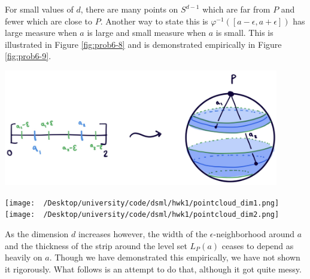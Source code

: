 \begin{homework}[e]
\begin{soln}
    For small values of $d$, there are many points on $S^{d-1}$ which are far from $P$ and fewer which are close to $P$. Another way to state this is $\varphi^{-1}([a-\epsilon,a+\epsilon])$ has large measure when $a$ is large and small measure when $a$ is small. This is illustrated in Figure \ref{fig:prob6-8} and is demonstrated empirically in Figure \ref{fig:prob6-9}.
    \begin{center}
      \includegraphics[width=12cm]{figures/hwk1-drawing3.png}
      \label{fig:prob6-8}
    \end{center}
    \begin{center}
      \texttt{[image: ~/Desktop/university/code/dsml/hwk1/pointcloud\_dim1.png]}
      \texttt{[image: ~/Desktop/university/code/dsml/hwk1/pointcloud\_dim2.png]}
      \label{fig:prob6-9}
    \end{center}
    As the dimension $d$ increases however, the width of the $\epsilon$-neighborhood around $a$ and the thickness of the strip around the level set $L_P(a)$ ceases to depend as heavily on $a$. Though we have demonstrated this empirically, we have not shown it rigorously. What follows is an attempt to do that, although it got quite messy.


\end{soln}
\end{homework}
